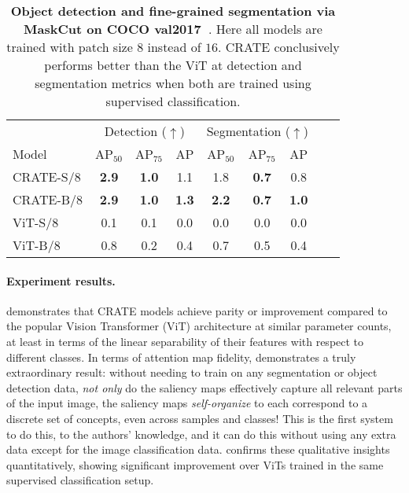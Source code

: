 \documentclass[../../book-main.tex]{subfiles}
\begin{document}
\begin{table}
    \centering
    \begin{tabular}{@{}lcccccccc@{}}
    \toprule
     &  \multicolumn{3}{c}{Detection (\(\uparrow\))} &  \multicolumn{3}{c}{Segmentation (\(\uparrow\))} \\ 
    Model & AP$_{50}$ & AP$_{75}$ & AP & AP$_{50}$ & AP$_{75}$ & AP  \\ 
    \midrule
    CRATE-S/8 & \textbf{2.9} & \textbf{1.0} & 1.1 & 1.8 & \textbf{0.7} & 0.8 \\
    CRATE-B/8 & \textbf{2.9} & \textbf{1.0} & \textbf{1.3} & \textbf{2.2} & \textbf{0.7} & \textbf{1.0} \\
    ViT-S/8 & 0.1& 0.1 & 0.0 & 0.0 & 0.0 & 0.0 \\
    ViT-B/8 & 0.8 & 0.2 & 0.4 & 0.7 & 0.5 & 0.4 \\
    \bottomrule
    \end{tabular}
    \caption{\small \textbf{Object detection and fine-grained segmentation via MaskCut on COCO {val2017}~\citep{lin2014microsoft}}. Here all models are trained with patch size \(8\) instead of \(16\). CRATE conclusively performs better than the ViT at detection and segmentation metrics when both are trained using supervised classification.}
    \label{tab:crate_detection_segmentation}
\end{table}


\paragraph{Experiment results.} 

 demonstrates that CRATE models achieve parity or improvement compared to the popular Vision Transformer (ViT) architecture at similar parameter counts, at least in terms of the linear separability of their features with respect to different classes. In terms of attention map fidelity,  demonstrates a truly extraordinary result: without needing to train on any segmentation or object detection data, \textit{not only} do the saliency maps effectively capture all relevant parts of the input image, the saliency maps \textit{self-organize} to each correspond to a discrete set of concepts, even across samples and classes! This is the first system to do this, to the authors' knowledge, and it can do this without using any extra data except for the image classification data.  confirms these qualitative insights quantitatively, showing significant improvement over ViTs trained in the same supervised classification setup.
\end{document}

